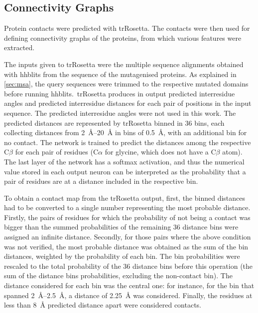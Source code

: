 \subsection{Connectivity Graphs}
Protein contacts were predicted with trRosetta.
The contacts were then used for defining connectivity graphs of the proteins, from which various features were extracted.

The inputs given to trRosetta were the multiple sequence alignments obtained with hhblits from the sequence of the mutagenised proteins.
As explained in \cref{sec:msa}, the query sequences were trimmed to the respective mutated domains before running hhblits.\
trRosetta produces in output predicted interresidue angles and predicted interresidue distances for each pair of positions in the input sequence.
The predicted interresidue angles were not used in this work.
The predicted distances are represented by trRosetta binned in 36 bins, each collecting distances from \SIrange{2}{20}{\angstrom} in bins of \SI{0.5}{\angstrom}, with an additional bin for no contact.
The network is trained to predict the distances among the respective C$\beta$ for each pair of residues (C$\alpha$ for glycine, which does not have a C$\beta$ atom).
The last layer of the network has a softmax activation, and thus the numerical value stored in each output neuron can be interpreted as the probability that a pair of residues are at a distance included in the respective bin.

To obtain a contact map from the trRosetta output, first, the binned distances had to be converted to a single number representing the most probable distance.
Firstly, the pairs of residues for which the probability of not being a contact was bigger than the summed probabilities of the remaining \num{36} distance bins were assigned an infinite distance.
Secondly, for those pairs where the above condition was not verified, the most probable distance was obtained as the sum of the bin distances, weighted by the probability of each bin.
The bin probabilities were rescaled to the total probability of the \num{36} distance bins before this operation (the sum of the distance bins probabilities, excluding the non-contact bin).
The distance considered for each bin was the central one: for instance, for the bin that spanned \SIrange{2}{2.5}{\angstrom}, a distance of \SI{2.25}{\angstrom} was considered.
Finally, the residues at less than \SI{8}{\angstrom} predicted distance apart were considered contacts.

